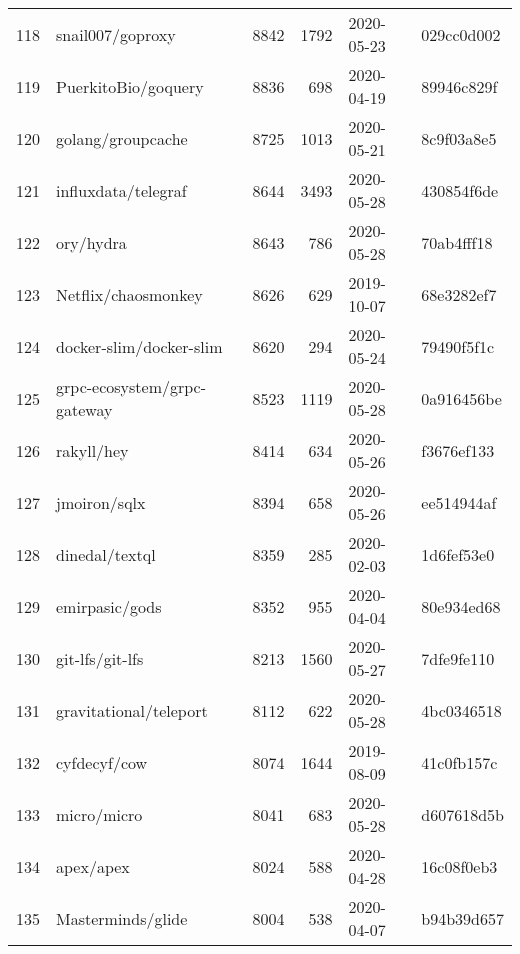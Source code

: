 \begin{longtable}{llrrll}
    118 &                                   snail007/goproxy &   8842 &   1792 & 2020-05-23 &  029cc0d002 \\
    119 &                                PuerkitoBio/goquery &   8836 &    698 & 2020-04-19 &  89946c829f \\
    120 &                                  golang/groupcache &   8725 &   1013 & 2020-05-21 &  8c9f03a8e5 \\
    121 &                                influxdata/telegraf &   8644 &   3493 & 2020-05-28 &  430854f6de \\
    122 &                                          ory/hydra &   8643 &    786 & 2020-05-28 &  70ab4fff18 \\
    123 &                                Netflix/chaosmonkey &   8626 &    629 & 2019-10-07 &  68e3282ef7 \\
    124 &                            docker-slim/docker-slim &   8620 &    294 & 2020-05-24 &  79490f5f1c \\
    125 &                        grpc-ecosystem/grpc-gateway &   8523 &   1119 & 2020-05-28 &  0a916456be \\
    126 &                                         rakyll/hey &   8414 &    634 & 2020-05-26 &  f3676ef133 \\
    127 &                                       jmoiron/sqlx &   8394 &    658 & 2020-05-26 &  ee514944af \\
    128 &                                     dinedal/textql &   8359 &    285 & 2020-02-03 &  1d6fef53e0 \\
    129 &                                     emirpasic/gods &   8352 &    955 & 2020-04-04 &  80e934ed68 \\
    130 &                                    git-lfs/git-lfs &   8213 &   1560 & 2020-05-27 &  7dfe9fe110 \\
    131 &                             gravitational/teleport &   8112 &    622 & 2020-05-28 &  4bc0346518 \\
    132 &                                       cyfdecyf/cow &   8074 &   1644 & 2019-08-09 &  41c0fb157c \\
    133 &                                        micro/micro &   8041 &    683 & 2020-05-28 &  d607618d5b \\
    134 &                                          apex/apex &   8024 &    588 & 2020-04-28 &  16c08f0eb3 \\
    135 &                                  Masterminds/glide &   8004 &    538 & 2020-04-07 &  b94b39d657 \\

\end{longtable}
